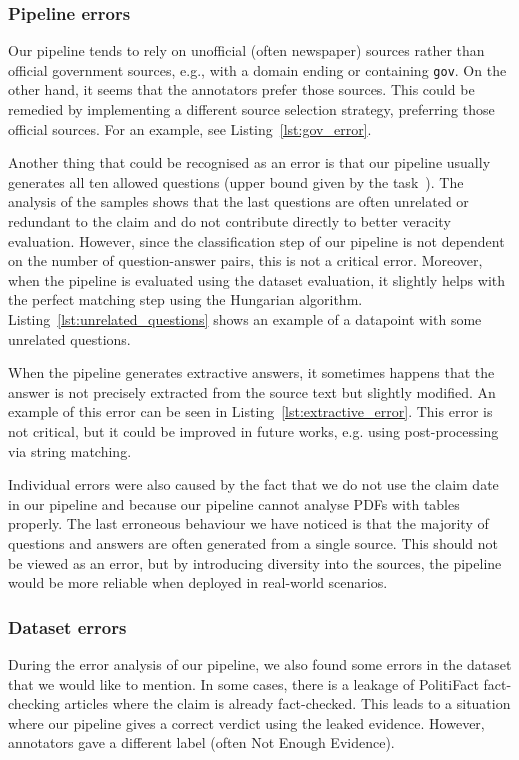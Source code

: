 \subsubsection{Pipeline errors}
Our pipeline tends to rely on unofficial (often newspaper) sources rather than official government sources, e.g., with a domain ending or containing \texttt{gov}. On the other hand, it seems that the annotators prefer those sources. This could be remedied by implementing a different source selection strategy, preferring those official sources. For an example, see Listing~\ref{lst:gov_error}.

Another thing that could be recognised as an error is that our pipeline usually generates all ten allowed questions (upper bound given by the task~\cite{averitec2024}). The analysis of the samples shows that the last questions are often unrelated or redundant to the claim and do not contribute directly to better veracity evaluation. However, since the classification step of our pipeline is not dependent on the number of question-answer pairs, this is not a critical error. Moreover, when the pipeline is evaluated using the \averitec{} dataset evaluation, it slightly helps with the perfect matching step using the Hungarian algorithm. Listing~\ref{lst:unrelated_questions} shows an example of a datapoint with some unrelated questions.

When the pipeline generates extractive answers, it sometimes happens that the answer is not precisely extracted from the source text but slightly modified. An example of this error can be seen in Listing~\ref{lst:extractive_error}. This error is not critical, but it could be improved in future works, e.g. using post-processing via string matching.

Individual errors were also caused by the fact that we do not use the claim date in our pipeline and because our pipeline cannot analyse PDFs with tables properly. The last erroneous behaviour we have noticed is that the majority of questions and answers are often generated from a single source. This should not be viewed as an error, but by introducing diversity into the sources, the pipeline would be more reliable when deployed in real-world scenarios.

\subsubsection{Dataset errors}
During the error analysis of our pipeline, we also found some errors in the \averitec{} dataset that we would like to mention. In some cases, there is a leakage of PolitiFact fact-checking articles where the claim is already fact-checked. This leads to a situation where our pipeline gives a correct verdict using the leaked evidence. However, annotators gave a different label (often Not Enough Evidence). 

